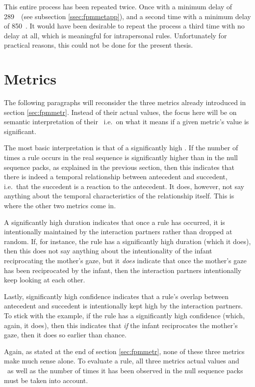 This entire process has been repeated twice.
Once with a minimum delay of 289~\ms\ (see subsection \ref{ssec:fpmmetapp}), and a second time with a minimum delay of 850~\ms.
It would have been desirable to repeat the process a third time with no delay at all, which is meaningful for intrapersonal rules.
Unfortunately for practical reasons, this could not be done for the present thesis.

\section{Metrics}
\label{sec:sigmetr}
The following paragraphs will reconsider the three metrics already introduced in section \ref{sec:fpmmetr}.
Instead of their actual values, the focus here will be on semantic interpretation of their \pv\, i.e.~on what it means if a given metric's value is significant.

The most basic interpretation is that of a significantly high \noc.
If the number of times a rule occurs in the real sequence is significantly higher than in the null sequence packs, as explained in the previous section, then this indicates that there is indeed a temporal relationship between antecedent and succedent, i.e.~that the succedent is a reaction to the antecedent.
It does, however, not say anything about the temporal characteristics of the relationship itself.
This is where the other two metrics come in.

A significantly high duration indicates that once a rule has occurred, it is intentionally maintained by the interaction partners rather than dropped at random.
If, for instance, the rule \fpmtextrule{\mogain}{\ingamo} has a significantly high duration (which it does), then this does not say anything about the intentionality of the infant reciprocating the mother's gaze, but it \emph{does} indicate that once the mother's gaze has been reciprocated by the infant, then the interaction partners intentionally keep looking at each other.

Lastly, significantly high confidence indicates that a rule's overlap between antecedent and succedent is intentionally kept high by the interaction partners.
To stick with the example, if the rule \fpmtextrule{\mogain}{\ingamo} has a significantly high confidence (which, again, it does), then this indicates that \emph{if} the infant reciprocates the mother's gaze, then it does so earlier than chance.

Again, as stated at the end of section \ref{sec:fpmmetr}, none of these three metrics make much sense alone.
To evaluate a rule, all three metrics actual values and \pv\ as well as the number of times it has been observed in the null sequence packs must be taken into account.


